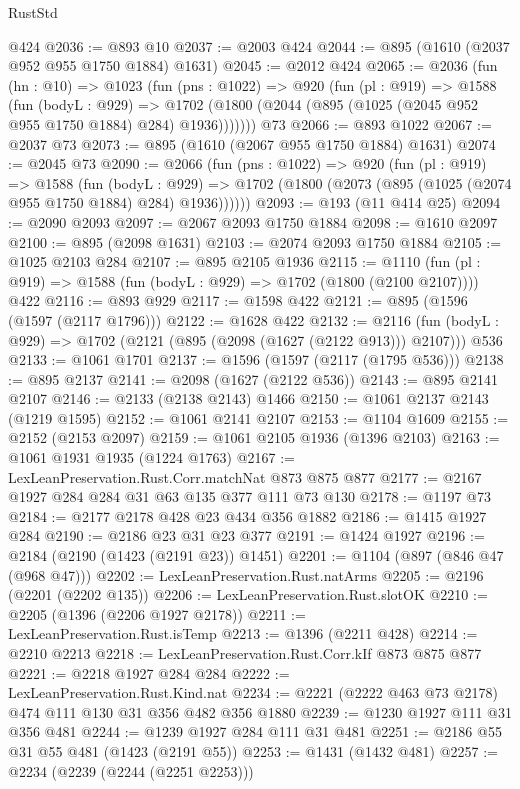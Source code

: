 \begin{lexlean}{RustStd}
\begin{coremodule}
    @424
@2036 := @893 @10
@2037 := @2003 @424
@2044 := @895 (@1610 (@2037 @952 @955 @1750 @1884) @1631)
@2045 := @2012 @424
@2065 := @2036
    (fun (hn : @10) =>
    @1023
      (fun (pns : @1022) =>
      @920
        (fun (pl : @919) =>
        @1588
          (fun (bodyL : @929) =>
          @1702 (@1800 (@2044 (@895 (@1025 (@2045 @952 @955 @1750 @1884) @284) @1936)))))))
    @73
@2066 := @893 @1022
@2067 := @2037 @73
@2073 := @895 (@1610 (@2067 @955 @1750 @1884) @1631)
@2074 := @2045 @73
@2090 := @2066
    (fun (pns : @1022) =>
    @920
      (fun (pl : @919) =>
      @1588
        (fun (bodyL : @929) =>
        @1702 (@1800 (@2073 (@895 (@1025 (@2074 @955 @1750 @1884) @284) @1936))))))
@2093 := @193 (@11 @414 @25)
@2094 := @2090 @2093
@2097 := @2067 @2093 @1750 @1884
@2098 := @1610 @2097
@2100 := @895 (@2098 @1631)
@2103 := @2074 @2093 @1750 @1884
@2105 := @1025 @2103 @284
@2107 := @895 @2105 @1936
@2115 := @1110 (fun (pl : @919) => @1588 (fun (bodyL : @929) => @1702 (@1800 (@2100 @2107)))) @422
@2116 := @893 @929
@2117 := @1598 @422
@2121 := @895 (@1596 (@1597 (@2117 @1796)))
@2122 := @1628 @422
@2132 := @2116 (fun (bodyL : @929) => @1702 (@2121 (@895 (@2098 (@1627 (@2122 @913))) @2107))) @536
@2133 := @1061 @1701
@2137 := @1596 (@1597 (@2117 (@1795 @536)))
@2138 := @895 @2137
@2141 := @2098 (@1627 (@2122 @536))
@2143 := @895 @2141 @2107
@2146 := @2133 (@2138 @2143) @1466
@2150 := @1061 @2137 @2143 (@1219 @1595)
@2152 := @1061 @2141 @2107
@2153 := @1104 @1609
@2155 := @2152 (@2153 @2097)
@2159 := @1061 @2105 @1936 (@1396 @2103)
@2163 := @1061 @1931 @1935 (@1224 @1763)
@2167 := LexLeanPreservation.Rust.Corr.matchNat @873 @875 @877
@2177 := @2167 @1927 @284 @284 @31 @63 @135 @377 @111 @73 @130
@2178 := @1197 @73
@2184 := @2177 @2178 @428 @23 @434 @356 @1882
@2186 := @1415 @1927 @284
@2190 := @2186 @23 @31 @23 @377
@2191 := @1424 @1927
@2196 := @2184 (@2190 (@1423 (@2191 @23)) @1451)
@2201 := @1104 (@897 (@846 @47 (@968 @47)))
@2202 := LexLeanPreservation.Rust.natArms
@2205 := @2196 (@2201 (@2202 @135))
@2206 := LexLeanPreservation.Rust.slotOK
@2210 := @2205 (@1396 (@2206 @1927 @2178))
@2211 := LexLeanPreservation.Rust.isTemp
@2213 := @1396 (@2211 @428)
@2214 := @2210 @2213
@2218 := LexLeanPreservation.Rust.Corr.kIf @873 @875 @877
@2221 := @2218 @1927 @284 @284
@2222 := LexLeanPreservation.Rust.Kind.nat
@2234 := @2221 (@2222 @463 @73 @2178) @474 @111 @130 @31 @356 @482 @356 @1880
@2239 := @1230 @1927 @111 @31 @356 @481
@2244 := @1239 @1927 @284 @111 @31 @481
@2251 := @2186 @55 @31 @55 @481 (@1423 (@2191 @55))
@2253 := @1431 (@1432 @481)
@2257 := @2234 (@2239 (@2244 (@2251 @2253)))

\end{coremodule}
\end{lexlean}
